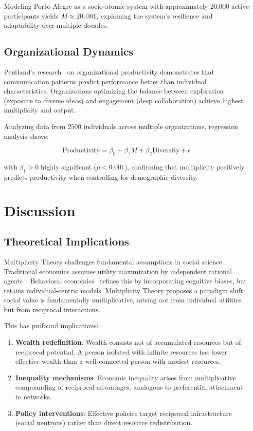 \documentclass[11pt,a4paper]{article}
\begin{document}
Modeling Porto Alegre as a socio-atomic system with approximately 20,000 active participants yields $M \approx 20,001$, explaining the system's resilience and adaptability over multiple decades.

\subsection{Organizational Dynamics}

Pentland's research~\cite{pentland2014} on organizational productivity demonstrates that communication patterns predict performance better than individual characteristics. Organizations optimizing the balance between exploration (exposure to diverse ideas) and engagement (deep collaboration) achieve highest multiplicity and output.

Analyzing data from 2500 individuals across multiple organizations, regression analysis shows:

\begin{equation}
\text{Productivity} = \beta_0 + \beta_1 M + \beta_2 \text{Diversity} + \epsilon
\end{equation}

with $\beta_1 > 0$ highly significant ($p < 0.001$), confirming that multiplicity positively predicts productivity when controlling for demographic diversity.

\section{Discussion}
\label{sec:discussion}

\subsection{Theoretical Implications}

Multiplicity Theory challenges fundamental assumptions in social science. Traditional economics assumes utility maximization by independent rational agents~\cite{smith1776}. Behavioral economics~\cite{kahneman2011} refines this by incorporating cognitive biases, but retains individual-centric models. Multiplicity Theory proposes a paradigm shift: social value is fundamentally multiplicative, arising not from individual utilities but from reciprocal interactions.

This has profound implications:

\begin{enumerate}
    \item \textbf{Wealth redefinition}: Wealth consists not of accumulated resources but of reciprocal potential. A person isolated with infinite resources has lower effective wealth than a well-connected person with modest resources.
    \item \textbf{Inequality mechanisms}: Economic inequality arises from multiplicative compounding of reciprocal advantages, analogous to preferential attachment in networks.
    \item \textbf{Policy interventions}: Effective policies target reciprocal infrastructure (social neutrons) rather than direct resource redistribution.
\end{enumerate}
\end{document}
